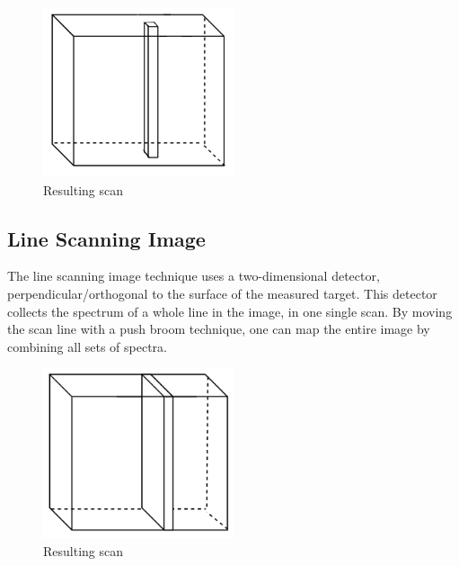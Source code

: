 \begin{figure}[H]
\centering
  \includegraphics[height=5cm]{Images/theory/voxel.png}
  \caption{ Resulting scan}
  \label{fig:voxel2}
\end{figure}


\subsection{Line Scanning Image} \label{sec:push}
The line scanning image technique uses a two-dimensional detector, perpendicular/orthogonal to the surface of the measured target. This detector collects the spectrum of a whole line in the image, in one single scan. By moving the scan line with a push broom technique, one can map the entire image by combining all sets of spectra.


\begin{figure}[H]
\centering
  \includegraphics[height=5cm]{Images/theory/pushbroom.png}
  \caption{ Resulting scan}
  \label{fig:pushbroom}
\end{figure}

